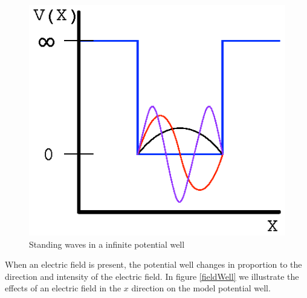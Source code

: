 \documentclass[authoryearcitations]{UoYCSproject}
\begin{document}
\begin{figure}[h]
 \centering
 \includegraphics[scale=1]{figures/confined.eps}
 \caption{Standing waves in a infinite potential well}
\label{confined}
\end{figure}




When an electric field is present, the potential well changes in proportion to the direction and intensity of the
electric field. In figure \ref{fieldWell} we illustrate the effects of an electric field in the $x$ direction on 
the model potential well.
\end{document}
